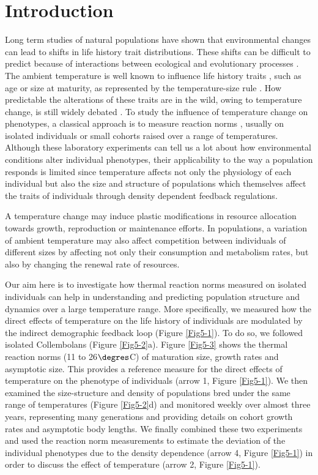 \section{Introduction}

Long term studies of natural populations have shown that environmental changes
can lead to shifts in life history trait
distributions\autocite{parmesan2006a,ozgul2009a}. These shifts can be difficult
to predict because of interactions between ecological and evolutionary processes
\autocite{kokko2007a}. The ambient temperature is well known to influence life
history traits \autocite{atkinson1996a,angilletta2009a}, such as age or size at maturity, as represented by the temperature-size rule
\autocite{berrigan1994a,fischer2002a,dhillon2004a}. How predictable the
alterations of these traits are in the wild, owing to temperature change, is
still widely debated \autocite{gardner2011a,sheridan2011a}.
To study the influence of temperature change on phenotypes, a classical approach
is to measure reaction norms \autocite{woltereck1909a}, usually on isolated
individuals \autocite{driessen2007a,ellers2011a} or small cohorts
\autocite{karan1998a,liefting2009a} raised over a range of temperatures.
Although these laboratory experiments can tell us a lot about how environmental
conditions alter individual phenotypes, their applicability to the way a
population responds is limited since temperature affects not only the
physiology of each individual but also the size and structure of populations
which themselves affect the traits of individuals through density dependent
feedback regulations.

A temperature change may induce plastic modifications in resource allocation
towards growth, reproduction or maintenance efforts. In populations, a variation
of ambient temperature may also affect competition between individuals of
different sizes by affecting not only their consumption and metabolism rates,
but also by changing the renewal rate of resources.

Our aim here is to investigate how thermal reaction norms measured on isolated
individuals can help in understanding and predicting population structure and
dynamics over a large temperature range. More specifically, we measured how the
direct effects of temperature on the life history of individuals are modulated
by the indirect demographic feedback loop (Figure \ref{Fig5-1}). To do so, we followed
isolated Collembolans (Figure \ref{Fig5-2}a). Figure \ref{Fig5-3} shows the thermal reaction norms (11 to
26$\degres$C) of maturation size, growth rates and asymptotic size. This provides a
reference measure for the direct effects of temperature on the phenotype of
individuals (arrow 1, Figure \ref{Fig5-1}). We then examined the size-structure and density
of populations bred under the same range of temperatures (Figure \ref{Fig5-2}d) and monitored
weekly over almost three years, representing many generations and providing
details on cohort growth rates and asymptotic body lengths. We finally combined
these two experiments and used the reaction norm measurements to estimate the
deviation of the individual phenotypes due to the density dependence (arrow 4,
Figure \ref{Fig5-1}) in order to discuss the effect of temperature (arrow 2, Figure \ref{Fig5-1}).

